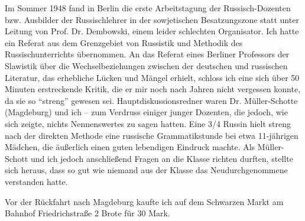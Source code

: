 Im Sommer 1948 fand in Berlin die erste Arbeitstagung der Russisch-Do\-zen\-ten bzw. Ausbilder der Russischlehrer in der sowjetischen Besatzungszone statt unter Leitung von Prof. Dr. Dembowski, einem leider schlechten Organisator. Ich hatte ein Referat aus dem Grenzgebiet von Russistik und Methodik des Russischunterrichts übernommen. An das Referat eines Berliner Professors der Slawistik über die Wechselbeziehungen zwischen der deutschen und russischen Literatur, das erhebliche Lücken und Mängel erhielt, schloss ich eine sich über 50 Minuten erstreckende  Kritik, die er mir noch nach Jahren nicht vergessen konnte, da sie so \enquote{streng} gewesen sei. Hauptdiskussionsredner waren Dr. Müller-Schotte (Magdeburg) und ich -- zum Verdruss einiger junger Dozenten, die jedoch, wie sich zeigte, nichts Nennenswertes zu sagen hatten. Eine 3/4 Russin hielt streng nach der direkten Methode eine russische Grammatikstunde bei etwa 11-jährigen Mädchen, die äußerlich einen guten lebendigen Eindruck machte. Als Müller-Schott und ich jedoch anschließend Fragen an die Klasse richten durften, stellte sich heraus, dass so gut wie niemand aus der Klasse das Neudurchgenommene verstanden hatte.

Vor der Rückfahrt nach Magdeburg kaufte ich auf dem Schwarzen Markt am Bahnhof Friedrichstraße 2 Brote für 30 Mark.

